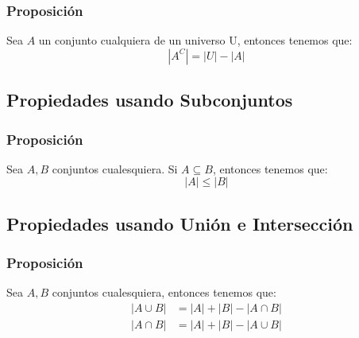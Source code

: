 \documentclass[12pt]{report}                                    %
\begin{document}
                \subsubsection{Proposición}
                    Sea $A$ un conjunto cualquiera de un universo U, entonces tenemos que:
                    \begin{equation*}
                        |A^C| = |U| - |A|
                    \end{equation*}  

            \subsection{Propiedades usando Subconjuntos}
                
                \subsubsection{Proposición}
                    Sea $A, B$ conjuntos cualesquiera. Si  $A \subseteq B$, entonces tenemos que:
                    \begin{equation*}
                        |A| \leq |B|
                    \end{equation*}


            \clearpage
            \subsection{Propiedades usando Unión e Intersección}
                
                \subsubsection{Proposición}
                    Sea $A, B$ conjuntos cualesquiera, entonces tenemos que:
                    \begin{equation*}
                    \begin{split}
                        |A \cup B| &= |A| + |B| - |A \cap B|    \\  
                        |A \cap B| &= |A| + |B| - |A \cup B|  
                    \end{split}
                    \end{equation*}
\end{document}
